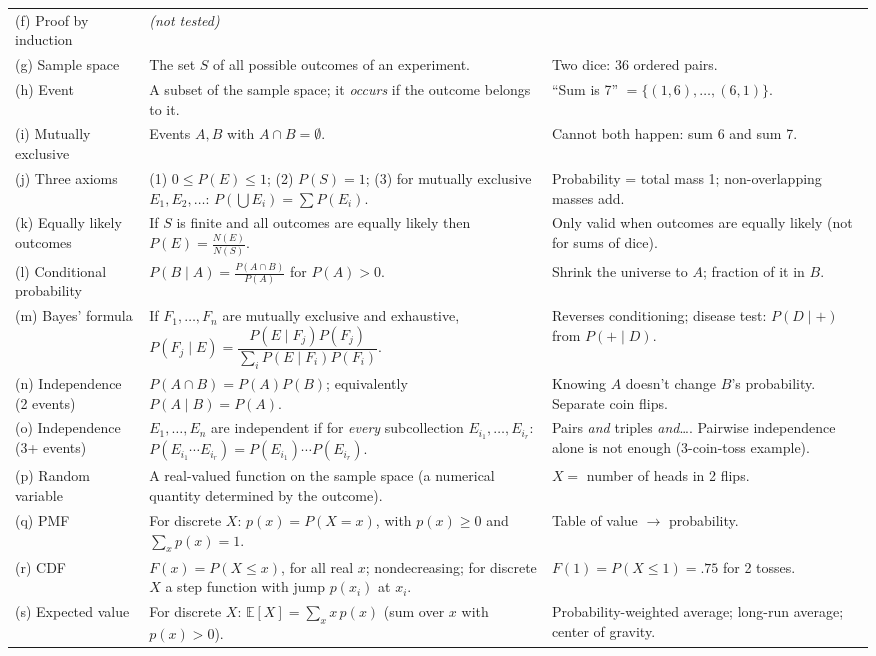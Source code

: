 \documentclass[11pt]{article}
\newcommand{\E}{\mathbb{E}}
\begin{document}
\begin{center}
\begin{longtable}{@{}>{\raggedright\arraybackslash}p{1.0in}>{\raggedright\arraybackslash}p{2.8in}>{\raggedright\arraybackslash}p{2.3in}@{}}
(f) Proof by induction & \emph{(not tested)} &\\
(g) Sample space & The set $S$ of all possible outcomes of an experiment. & Two dice: 36 ordered pairs.\\
(h) Event & A subset of the sample space; it \emph{occurs} if the outcome belongs to it. & ``Sum is 7'' $=\{(1,6),\dots,(6,1)\}$.\\
(i) Mutually exclusive & Events $A,B$ with $A\cap B=\emptyset$. & Cannot both happen: sum 6 and sum 7.\\
(j) Three axioms & (1) $0\le P(E)\le1$; (2) $P(S)=1$; (3) for mutually exclusive $E_1,E_2,\dots$: $P(\bigcup E_i)=\sum P(E_i)$. & Probability = total mass 1; non-overlapping masses add.\\
(k) Equally likely outcomes & If $S$ is finite and all outcomes are equally likely then $P(E)=\frac{N(E)}{N(S)}$. & Only valid when outcomes are equally likely (not for sums of dice).\\
(l) Conditional probability & $P(B\mid A)=\frac{P(A\cap B)}{P(A)}$ for $P(A)>0$. & Shrink the universe to $A$; fraction of it in $B$.\\
(m) Bayes' formula & If $F_1,\dots,F_n$ are mutually exclusive and exhaustive, $P(F_j\mid E)=\dfrac{P(E\mid F_j)P(F_j)}{\sum_{i}P(E\mid F_i)P(F_i)}$. & Reverses conditioning; disease test: $P(D\mid+)$ from $P(+\mid D)$.\\
(n) Independence (2 events) & $P(A\cap B)=P(A)P(B)$; equivalently $P(A\mid B)=P(A)$. & Knowing $A$ doesn't change $B$'s probability. Separate coin flips.\\
(o) Independence (3+ events) & $E_1,\dots,E_n$ are independent if for \emph{every} subcollection $E_{i_1},\dots,E_{i_r}$: $P(E_{i_1}\cdots E_{i_r})=P(E_{i_1})\cdots P(E_{i_r})$. & Pairs \emph{and} triples \emph{and}\dots. Pairwise independence alone is not enough (3-coin-toss example).\\
(p) Random variable & A real-valued function on the sample space (a numerical quantity determined by the outcome). & $X=$ number of heads in 2 flips.\\
(q) PMF & For discrete $X$: $p(x)=P(X=x)$, with $p(x)\ge0$ and $\sum_xp(x)=1$. & Table of value $\to$ probability.\\
(r) CDF & $F(x)=P(X\le x)$, for all real $x$; nondecreasing; for discrete $X$ a step function with jump $p(x_i)$ at $x_i$. & $F(1)=P(X\le1)=.75$ for 2 tosses.\\
(s) Expected value & For discrete $X$: $\E[X]=\sum_xx\,p(x)$ (sum over $x$ with $p(x)>0$). & Probability-weighted average; long-run average; center of gravity.\\
\bottomrule
\end{longtable}
\end{center}
\end{document}
